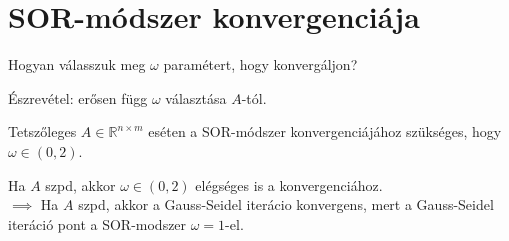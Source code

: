 \section{SOR-módszer konvergenciája}
\begin{kerdes}
    Hogyan válasszuk meg $\omega$ paramétert, hogy konvergáljon?
\end{kerdes}
Észrevétel: erősen függ $\omega$ választása $A$-tól.
\begin{allitas}
    Tetszőleges $A \in \mathbb{R}^{n \times m}$ eséten a SOR-módszer konvergenciájához szükséges, hogy $\omega \in (0, 2)$.
\end{allitas}
\begin{allitas}
    Ha $A$ szpd, akkor $\omega \in (0, 2)$ elégséges is a konvergenciához. \\
$\implies$ Ha $A$ szpd, akkor a Gauss-Seidel iterácio konvergens, mert a Gauss-Seidel iteráció pont a SOR-modszer $\omega = 1$-el.
\end{allitas}

